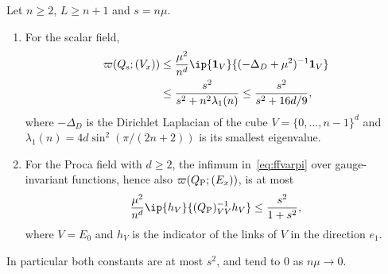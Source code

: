 \begin{proposition}\label{prop:ffupper}
Let $n\ge2$, $L\ge n+1$ and $s=n\mu$.
\begin{enumerate}[label=\textup{(\roman*)},leftmargin=*]
\item For the scalar field,
\begin{align*}
\varpi(Q_{\rm s};(V_x))&\le\frac{\mu^2}{n^d}\ip{\mathbf 1_V}{(-\Delta_D+\mu^2)
^{-1}\mathbf 1_V}\\
&\le\frac{s^2}{s^2+n^2\lambda_1(n)}\le\frac{s^2}{s^2+16d/9},
\end{align*}
where $-\Delta_D$ is the Dirichlet Laplacian of the cube $V=\{0,\dots,n-1
\}^d$ and $\lambda_1(n)=4d\sin^2(\pi/(2n+2))$ is its smallest eigenvalue.
\item For the Proca field with $d\ge2$, the infimum in~\eqref{eq:ffvarpi}
over gauge-invariant functions, hence also $\varpi(Q_{\rm P};(E_x))$, is at
most
\[
\frac{\mu^2}{n^d}\ip{h_V}{(Q_{\rm P})_{VV}^{-1}h_V}\le\frac{s^2}{1+s^2},
\]
where $V=E_0$ and $h_V$ is the indicator of the links of $V$ in the
direction $e_1$.
\end{enumerate}
In particular both constants are at most $s^2$, and tend to $0$ as
$n\mu\to0$.
\end{proposition}

